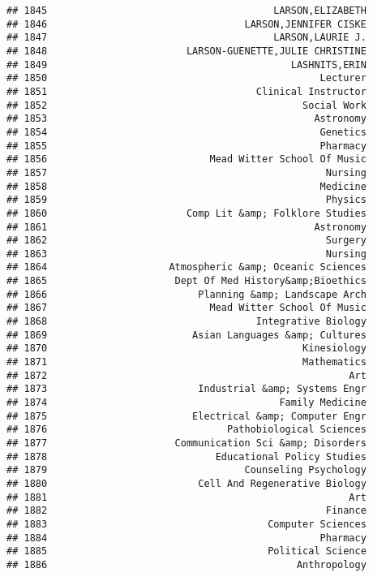 \documentclass[
]{article}
\begin{document}
\begin{verbatim}
## 1845                                       LARSON,ELIZABETH
## 1846                                  LARSON,JENNIFER CISKE
## 1847                                       LARSON,LAURIE J.
## 1848                        LARSON-GUENETTE,JULIE CHRISTINE
## 1849                                          LASHNITS,ERIN
## 1850                                               Lecturer
## 1851                                    Clinical Instructor
## 1852                                            Social Work
## 1853                                              Astronomy
## 1854                                               Genetics
## 1855                                               Pharmacy
## 1856                            Mead Witter School Of Music
## 1857                                                Nursing
## 1858                                               Medicine
## 1859                                                Physics
## 1860                        Comp Lit &amp; Folklore Studies
## 1861                                              Astronomy
## 1862                                                Surgery
## 1863                                                Nursing
## 1864                     Atmospheric &amp; Oceanic Sciences
## 1865                      Dept Of Med History&amp;Bioethics
## 1866                          Planning &amp; Landscape Arch
## 1867                            Mead Witter School Of Music
## 1868                                    Integrative Biology
## 1869                         Asian Languages &amp; Cultures
## 1870                                            Kinesiology
## 1871                                            Mathematics
## 1872                                                    Art
## 1873                          Industrial &amp; Systems Engr
## 1874                                        Family Medicine
## 1875                         Electrical &amp; Computer Engr
## 1876                               Pathobiological Sciences
## 1877                      Communication Sci &amp; Disorders
## 1878                             Educational Policy Studies
## 1879                                  Counseling Psychology
## 1880                          Cell And Regenerative Biology
## 1881                                                    Art
## 1882                                                Finance
## 1883                                      Computer Sciences
## 1884                                               Pharmacy
## 1885                                      Political Science
## 1886                                           Anthropology

\end{verbatim}
\end{document}
